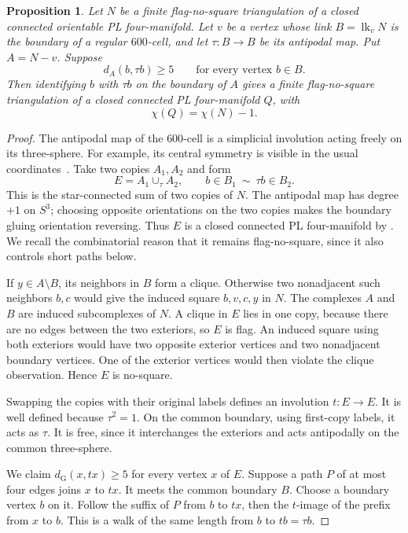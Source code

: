 \documentclass[11pt]{article}
\newtheorem{proposition}[theorem]{Proposition}
\newcommand{\lk}{\operatorname{lk}}
\newcommand{\dist}{d_{\mathrm G}}
\begin{document}
\begin{proposition}\label{prop:fold}
Let $N$ be a finite flag-no-square triangulation of a closed connected
orientable PL four-manifold. Let $v$ be a vertex whose link
$B=\lk_v N$ is the boundary of a regular $600$-cell, and let
$\tau:B\to B$ be its antipodal map. Put $A=N-v$.
Suppose
\begin{equation}\label{eq:antistar}
  d_{A}(b,\tau b)\geq 5
  \qquad\text{for every vertex }b\in B.
\end{equation}
Then identifying $b$ with $\tau b$ on the boundary of $A$
gives a finite flag-no-square triangulation of a closed connected
PL four-manifold $Q$, with
\[
  \chi(Q)=\chi(N)-1.
\]
\end{proposition}

\begin{proof}
The antipodal map of the $600$-cell is a simplicial involution
acting freely on its three-sphere. For example, its central symmetry is
visible in the usual coordinates~\cite[Example~1.27]{Heckman}.
Take two copies $A_1,A_2$ and form
\[
  E=A_1\cup_\tau A_2,
  \qquad b\in B_1\ \sim\ \tau b\in B_2.
\]
This is the star-connected sum of two copies of $N$. The antipodal
map has degree $+1$ on $S^3$; choosing opposite orientations on the
two copies makes the boundary gluing orientation reversing.
Thus $E$ is a closed connected PL four-manifold by
\cite[Lemma~1.3]{KNS}. We recall the combinatorial reason that it
remains flag-no-square, since it also controls short paths below.

If $y\in A\setminus B$, its neighbors in $B$ form a clique.
Otherwise two nonadjacent such neighbors $b,c$ would give the
induced square $b,v,c,y$ in $N$.
The complexes $A$ and $B$ are induced subcomplexes of $N$.
A clique in $E$ lies in one copy, because there are no edges
between the two exteriors, so $E$ is flag.
An induced square using both exteriors would have two opposite
exterior vertices and two nonadjacent boundary vertices. One of the
exterior vertices would then violate the clique observation.
Hence $E$ is no-square.

Swapping the copies with their original labels defines an involution
$t:E\to E$. It is well defined because $\tau^2=1$.
On the common boundary, using first-copy labels, it acts as $\tau$.
It is free, since it interchanges the exteriors and acts antipodally
on the common three-sphere.

We claim $\dist(x,t x)\geq 5$ for every vertex $x$ of $E$.
Suppose a path $P$ of at most four edges joins $x$ to $t x$.
It meets the common boundary $B$. Choose a boundary vertex $b$
on it. Follow the suffix of $P$ from $b$ to $t x$, then the
$t$-image of the prefix from $x$ to $b$. This is a walk of the
same length from $b$ to $t b=\tau b$.


\end{proof}
\end{document}

